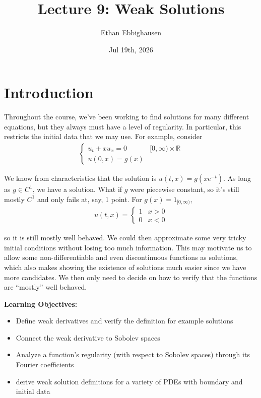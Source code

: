 \documentclass{article}
\title{Lecture 9: Weak Solutions}
\author{Ethan Ebbighausen}
\date{Jul 19th, 2026}
\newcommand{\R}{{\mathbb{R}}}
\begin{document}
	\pagestyle{fancy}
	\fancyfoot{} 
	
	\maketitle
	
	\section{Introduction}
	
	Throughout the course, we've been working to find solutions for many different equations, but they always must have a level of regularity. In particular, this restricts the initial data that we may use. For example, consider 
	\begin{align*}
		\begin{cases}
			u_{t} + x u_{x} = 0 & [0,\infty) \times \R \\
			u(0,x) = g(x)
		\end{cases}
	\end{align*}
	
	We know from characteristics that the solution is $u(t,x) = g(xe^{-t})$. As long as $g \in C^{1}$, we have a solution. What if $g$ were piecewise constant, so it's still mostly $C^{1}$ and only fails at, say, 1 point. For $g(x) = 1_{[0,\infty)}$, 
	\begin{align*}
		u(t,x) = \begin{cases} 1 & x>0 \\ 0 & x<0 \end{cases}
	\end{align*}
	
	so it is still mostly well behaved. We could then approximate some very tricky initial conditions without losing too much information. This may motivate us to allow some non-differentiable and even discontinuous functions as solutions, which also makes showing the existence of solutions much easier since we have more candidates. We then only need to decide on how to verify that the functions are ``mostly'' well behaved. 
	
	\vspace{1 cm}
	\textbf{Learning Objectives:}
	
	\begin{itemize}
		\item Define weak derivatives and verify the definition for example solutions
		\item Connect the weak derivative to Sobolev spaces
		\item Analyze a function's regularity (with respect to Sobolev spaces) through its Fourier coefficients
		\item derive weak solution definitions for a variety of PDEs with boundary and initial data
	\end{itemize}
	
\end{document}
